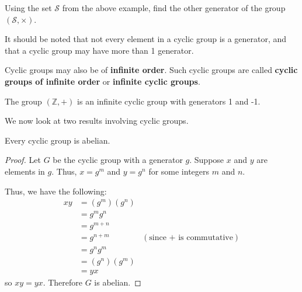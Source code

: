 \begin{exercise}
    Using the set $\mathcal{S}$ from the above example, find the other generator of the group $(\mathcal{S}, \times)$.
\end{exercise}

It should be noted that not every element in a cyclic group is a generator, and that a cyclic group may have more than 1 generator.

Cyclic groups may also be of \textbf{infinite order}. Such cyclic groups are called \textbf{cyclic groups of infinite order} or \textbf{infinite cyclic groups}.
\begin{example}
    The group $(\mathbb{Z}, +)$ is an infinite cyclic group with generators 1 and -1.
\end{example}

We now look at two results involving cyclic groups.

\begin{proposition}\label{prop-cyclic-group-is-abelian}
    Every cyclic group is abelian.
\end{proposition}
\begin{proof}
    Let $G$ be the cyclic group with a generator $g$. Suppose $x$ and $y$ are elements in $g$. Thus, $x = g^m$ and $y = g^n$ for some integers $m$ and $n$.

    Thus, we have the following:
    \begin{align*}
        xy &= (g^m)(g^n)\\
        &= g^mg^n\\
        &= g^{m+n}\\
        &= g^{n+m} & (\text{since + is commutative})\\
        &= g^ng^m\\
        &= (g^n)(g^m)\\
        &= yx
    \end{align*}
    so $xy = yx$. Therefore $G$ is abelian.
\end{proof}

